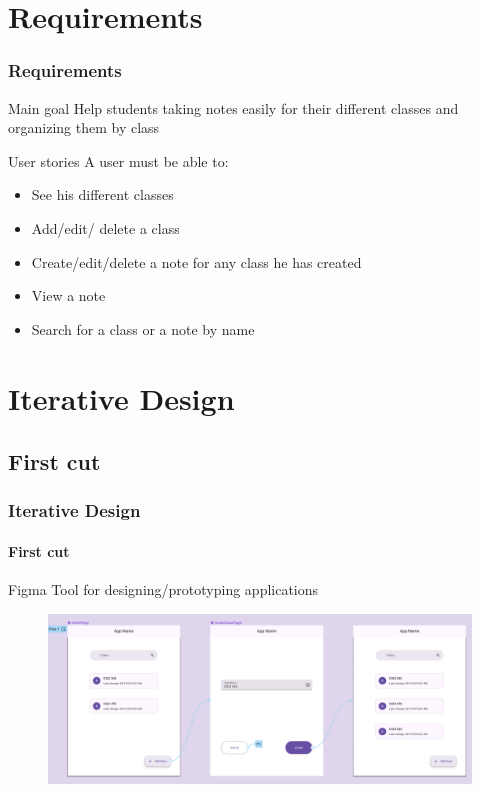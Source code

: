 \documentclass{beamer}
\begin{document}
	\section{Requirements}
	\begin{frame}
		\frametitle{Requirements}
		
		\begin{alertblock}{Main goal}
			Help students taking notes easily for their different classes and organizing them by class
		\end{alertblock}
		
		\begin{alertblock}{User stories}
			A user must be able to:
			\begin{itemize}
				\item See his different classes
				\item Add/edit/ delete a class
				\item Create/edit/delete a note for any class he has created
				\item View a note
				\item  Search for a class or a note by name
			\end{itemize}
		\end{alertblock}
	\end{frame}
	
	\section{Iterative Design}
	\subsection{First cut}
	\begin{frame}
		\frametitle{Iterative Design}
		\framesubtitle{First cut}
		
		\begin{alertblock}{Figma}
			Tool for designing/prototyping applications
		\end{alertblock}
		
		\begin{figure}
			\centering
			\begin{minipage}{1\textwidth}
				\includegraphics[width=\linewidth]{figma_user_story_create_class}
			\end{minipage}
		\end{figure}
	\end{frame}
	
\end{document}
